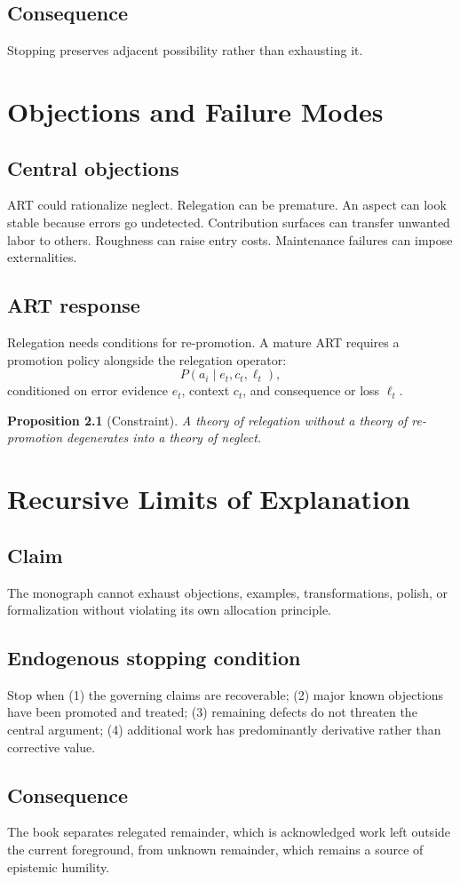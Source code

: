 \documentclass[11pt,openany]{book}
\newtheorem{proposition}{Proposition}[chapter]
\begin{document}
\section{Consequence}
Stopping preserves adjacent possibility rather than exhausting it.

\chapter{Objections and Failure Modes}
\section{Central objections}
ART could rationalize neglect. Relegation can be premature. An aspect can
look stable because errors go undetected. Contribution surfaces can
transfer unwanted labor to others. Roughness can raise entry costs.
Maintenance failures can impose externalities.
\section{ART response}
Relegation needs conditions for re-promotion. A mature ART requires a
promotion policy alongside the relegation operator:
\[
  P(a_i\mid e_t,c_t,\ell_t),
\]
conditioned on error evidence $e_t$, context $c_t$, and consequence or
loss $\ell_t$.
\begin{proposition}[Constraint]
A theory of relegation without a theory of re-promotion degenerates into a
theory of neglect.
\end{proposition}

\chapter{Recursive Limits of Explanation}
\section{Claim}
The monograph cannot exhaust objections, examples, transformations,
polish, or formalization without violating its own allocation principle.
\section{Endogenous stopping condition}
Stop when (1) the governing claims are recoverable; (2) major known
objections have been promoted and treated; (3) remaining defects do not
threaten the central argument; (4) additional work has predominantly
derivative rather than corrective value.
\section{Consequence}
The book separates relegated remainder, which is acknowledged work left
outside the current foreground, from unknown remainder, which remains a
source of epistemic humility.
\end{document}
